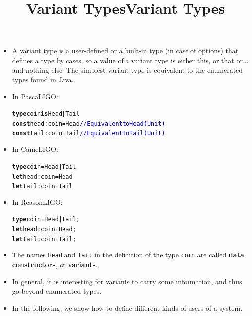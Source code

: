 \documentclass[wide]{slides}
\newcommand{\Kconst}[0]{\textbf{const}\xspace}
\newcommand{\Kis}[0]{\textbf{is}\xspace}
\newcommand{\Ktype}[0]{\textbf{type}\xspace}
\newcommand{\Klet}[0]{\textbf{let}\xspace}
\newcommand{\com}[1]{\textcolor{blue}{{#1}}}
\begin{document}
\begin{slide}
  \title{Variant Types}

  \begin{itemize}

    \item A variant type is a user-defined or a built-in type (in case
      of options) that defines a type by cases, so a value of a
      variant type is either this, or that or... and nothing else. The
      simplest variant type is equivalent to the enumerated types
      found in Java.

    \item In PascaLIGO:
      \begin{alltt}
\Ktype coin \Kis Head | Tail
\Kconst head : coin = Head \com{// Equivalent to Head (Unit)}
\Kconst tail : coin = Tail \com{// Equivalent to Tail (Unit)}
      \end{alltt}

      \vspace{-5mm}
    \item In CameLIGO:
      \begin{alltt}
\Ktype coin = Head | Tail
\Klet head : coin = Head
\Klet tail : coin = Tail
      \end{alltt}

      \vspace{-5mm}
    \item In ReasonLIGO:
      \begin{alltt}
\Ktype coin = Head | Tail;
\Klet head : coin = Head;
\Klet tail : coin = Tail;
      \end{alltt}

  \end{itemize}

\end{slide}

\begin{slide}
  \title{Variant Types}

  \begin{itemize}

    \item The names \texttt{Head} and \texttt{Tail} in the definition
      of the type \texttt{coin} are called \textbf{data constructors},
      or \textbf{variants}.

    \item In general, it is interesting for variants to carry some
      information, and thus go beyond enumerated types.

    \item In the following, we show how to define different kinds of
      users of a system.

  \end{itemize}

\end{slide}
\end{document}
